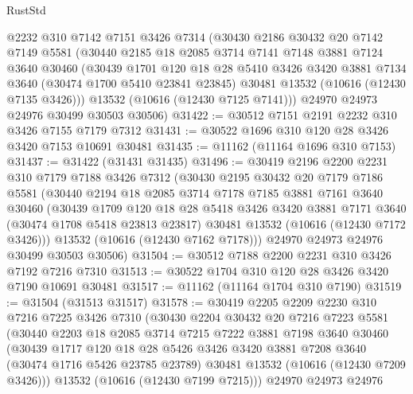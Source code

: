 \begin{lexlean}{RustStd}
\begin{coremodule}
    @2232
    @310
    @7142
    @7151
    @3426
    @7314
    (@30430
      @2186
      @30432
      @20
      @7142
      @7149
      @5581
      (@30440
        @2185
        @18
        @2085
        @3714
        @7141
        @7148
        @3881
        @7124
        @3640
        @30460
        (@30439
          @1701
          @120
          @18
          @28
          @5410
          @3426
          @3420
          @3881
          @7134
          @3640
          (@30474 @1700 @5410 @23841 @23845)
          @30481
          @13532
          (@10616 (@12430 @7135 @3426)))
        @13532
        (@10616 (@12430 @7125 @7141)))
      @24970
      @24973
      @24976
      @30499
      @30503
      @30506)
@31422 := @30512 @7151 @2191 @2232 @310 @3426 @7155 @7179 @7312
@31431 := @30522 @1696 @310 @120 @28 @3426 @3420 @7153 @10691 @30481
@31435 := @11162 (@11164 @1696 @310 @7153)
@31437 := @31422 (@31431 @31435)
@31496 := @30419
    @2196
    @2200
    @2231
    @310
    @7179
    @7188
    @3426
    @7312
    (@30430
      @2195
      @30432
      @20
      @7179
      @7186
      @5581
      (@30440
        @2194
        @18
        @2085
        @3714
        @7178
        @7185
        @3881
        @7161
        @3640
        @30460
        (@30439
          @1709
          @120
          @18
          @28
          @5418
          @3426
          @3420
          @3881
          @7171
          @3640
          (@30474 @1708 @5418 @23813 @23817)
          @30481
          @13532
          (@10616 (@12430 @7172 @3426)))
        @13532
        (@10616 (@12430 @7162 @7178)))
      @24970
      @24973
      @24976
      @30499
      @30503
      @30506)
@31504 := @30512 @7188 @2200 @2231 @310 @3426 @7192 @7216 @7310
@31513 := @30522 @1704 @310 @120 @28 @3426 @3420 @7190 @10691 @30481
@31517 := @11162 (@11164 @1704 @310 @7190)
@31519 := @31504 (@31513 @31517)
@31578 := @30419
    @2205
    @2209
    @2230
    @310
    @7216
    @7225
    @3426
    @7310
    (@30430
      @2204
      @30432
      @20
      @7216
      @7223
      @5581
      (@30440
        @2203
        @18
        @2085
        @3714
        @7215
        @7222
        @3881
        @7198
        @3640
        @30460
        (@30439
          @1717
          @120
          @18
          @28
          @5426
          @3426
          @3420
          @3881
          @7208
          @3640
          (@30474 @1716 @5426 @23785 @23789)
          @30481
          @13532
          (@10616 (@12430 @7209 @3426)))
        @13532
        (@10616 (@12430 @7199 @7215)))
      @24970
      @24973
      @24976

\end{coremodule}
\end{lexlean}
